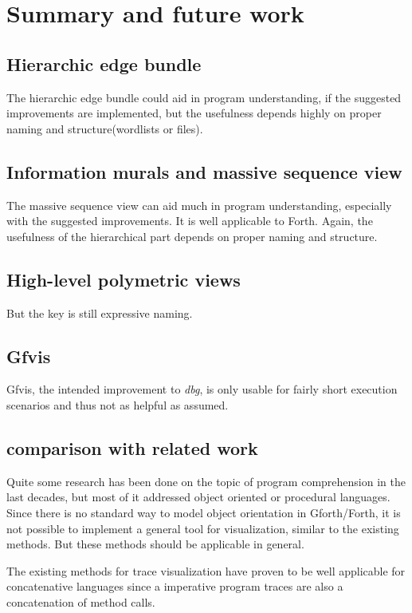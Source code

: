 \chapter{Summary and future work}
\label{chap:Summary}

\section*{Hierarchic edge bundle}
The hierarchic edge bundle could aid in program understanding, if the suggested improvements are implemented, but the usefulness depends highly on proper naming and structure(wordlists or files).

\section*{Information murals and massive sequence view}
The massive sequence view can aid much in program understanding, especially with the suggested improvements. It is well applicable to Forth. Again, the usefulness of the hierarchical part depends on proper naming and structure.

\section*{High-level polymetric views}

But the key is still expressive naming.

\section*{Gfvis}

Gfvis, the intended improvement to \emph{dbg}, is only usable for fairly short execution scenarios and thus not as helpful as assumed.

\section{comparison with related work}

Quite some research has been done on the topic of program comprehension in the last decades, but most of it addressed object oriented or procedural languages. Since there is no standard way to model object orientation in Gforth/Forth, it is not possible to implement a general tool for visualization, similar to the existing methods. But these methods should be applicable in general.

The existing methods for trace visualization have proven to be well applicable for concatenative languages since a imperative program traces are also a concatenation of method calls.

